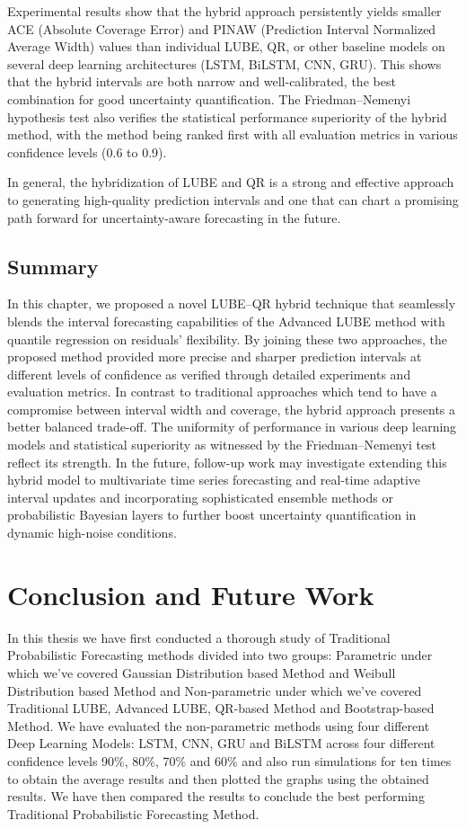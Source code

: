 Experimental results show that the hybrid approach persistently yields smaller ACE (Absolute Coverage Error) and PINAW (Prediction Interval Normalized Average Width) values than individual LUBE, QR, or other baseline models on several deep learning architectures (LSTM, BiLSTM, CNN, GRU). This shows that the hybrid intervals are both narrow and well-calibrated, the best combination for good uncertainty quantification. The Friedman–Nemenyi hypothesis test also verifies the statistical performance superiority of the hybrid method, with the method being ranked first with all evaluation metrics in various confidence levels (0.6 to 0.9).

In general, the hybridization of LUBE and QR is a strong and effective approach to generating high-quality prediction intervals and one that can chart a promising path forward for uncertainty-aware forecasting in the future.

\section{Summary}
In this chapter, we proposed a novel LUBE–QR hybrid technique that seamlessly blends the interval forecasting capabilities of the Advanced LUBE method with quantile regression on residuals' flexibility. By joining these two approaches, the proposed method provided more precise and sharper prediction intervals at different levels of confidence as verified through detailed experiments and evaluation metrics. In contrast to traditional approaches which tend to have a compromise between interval width and coverage, the hybrid approach presents a better balanced trade-off. The uniformity of performance in various deep learning models and statistical superiority as witnessed by the Friedman–Nemenyi test reflect its strength. 
In the future, follow-up work may investigate extending this hybrid model to multivariate time series forecasting and real-time adaptive interval updates and incorporating sophisticated ensemble methods or probabilistic Bayesian layers to further boost uncertainty quantification in dynamic high-noise conditions.


\chapter{Conclusion and Future Work}

In this thesis we have first conducted a thorough study of Traditional Probabilistic Forecasting methods divided into two groups: Parametric under which we've covered Gaussian Distribution based Method and Weibull Distribution based Method and Non-parametric under which we've covered Traditional LUBE, Advanced LUBE, QR-based Method and Bootstrap-based Method. We have evaluated the non-parametric methods using four different Deep Learning Models: LSTM, CNN, GRU and BiLSTM across four different confidence levels 90\%, 80\%, 70\% and 60\% and also run simulations for ten times to obtain the average results and then plotted the graphs using the obtained results. We have then compared the results to conclude the best performing Traditional Probabilistic Forecasting Method.

